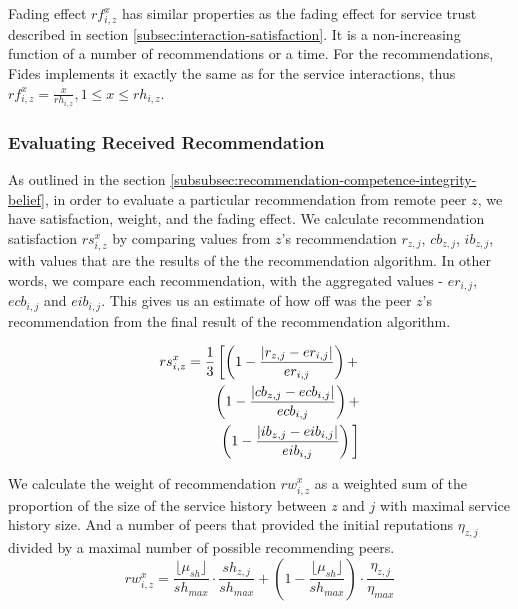 Fading effect $rf^{x}_{i, z}$ has similar properties as the fading effect for service trust described in section \ref{subsec:interaction-satisfaction}. It is a non-increasing function of a number of recommendations or a time. 
For the recommendations, Fides implements it exactly the same as for the service interactions, thus $rf^{x}_{i, z} = \frac{x}{rh_{i, z}}, 1 \leq x \leq rh_{i,z}$.

\subsubsection{Evaluating Received Recommendation}
As outlined in the section \ref{subsubsec:recommendation-competence-integrity-belief}, in order to evaluate a particular recommendation from remote peer $z$, we have satisfaction, weight, and the fading effect. 
We calculate recommendation satisfaction $rs^{x}_{i,z}$ by comparing values from $z$'s recommendation $r_{z,j}$, $cb_{z,j}$, $ib_{z,j}$, with values that are the results of the the recommendation algorithm.
In other words, we compare each recommendation, with the aggregated values - $er_{i,j}$, $ecb_{i,j}$ and $eib_{i,j}$. This gives us an estimate of how off was the peer $z$'s recommendation from the final result of the recommendation algorithm.

\begin{equation}
\begin{split}
    rs^{x}_{i,z} = \frac{1}{3} \left[ \left(1-\frac{\left|r_{z, j} - er_{i,j}\right|}{er_{i,j}}\right) + \right. \\
    \left(1 - \frac{\left|cb_{z, j} - ecb_{i, j}\right|}{ecb_{i, j}}\right) + \\
    \left. \left(1 - \frac{\left|ib_{z, j} - eib_{i, j}\right|}{eib_{i, j}}\right)\vphantom{\frac{1}{2}}\right]
\end{split}
\end{equation}

We calculate the weight of recommendation $rw^{x}_{i,z}$ as a weighted sum of the proportion of the size of the service history between $z$ and $j$ with maximal service history size. And a number of peers that provided the initial reputations $\eta_{z,j}$ divided by a maximal number of possible recommending peers.
\begin{equation}
    rw^{x}_{i,z} = \frac{\lfloor\mu_{sh}\rfloor}{sh_{max}} \cdot \frac{sh_{z, j}}{sh_{max}} + \left(1 - \frac{\lfloor\mu_{sh}\rfloor}{sh_{max}}\right) \cdot \frac{\eta_{z,j}}{\eta_{max}}
\end{equation}
